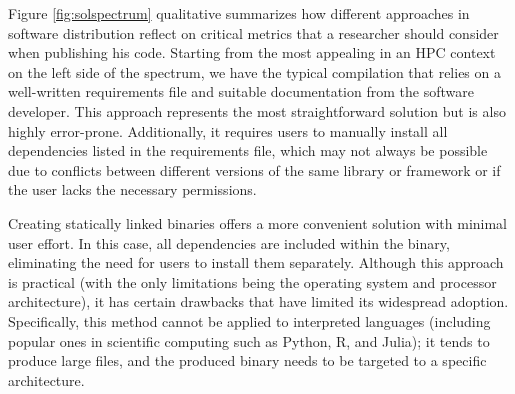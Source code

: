 
Figure \ref{fig:solspectrum}  qualitative summarizes how different approaches in
software distribution reflect on critical metrics that a researcher should
consider when publishing his code. Starting from the most appealing in an HPC
context on the left side of the spectrum, we have the typical compilation that
relies on a well-written requirements file and suitable documentation from the
software developer. This approach represents the most straightforward solution
but is also highly error-prone. Additionally, it requires users to manually
install all dependencies listed in the requirements file, which may not always
be possible due to conflicts between different versions of the same library or
framework or if the user lacks the necessary permissions.


Creating statically linked binaries offers a more convenient solution with
minimal user effort. In this case, all dependencies are included within the
binary, eliminating the need for users to install them separately. Although this
approach is practical (with the only limitations being the operating system and
processor architecture), it has certain drawbacks that have limited its
widespread adoption. Specifically, this method cannot be applied to interpreted
languages (including popular ones in scientific computing such as Python, R, and
Julia); it tends to produce large files, and the produced binary needs to be
targeted to a specific architecture.

